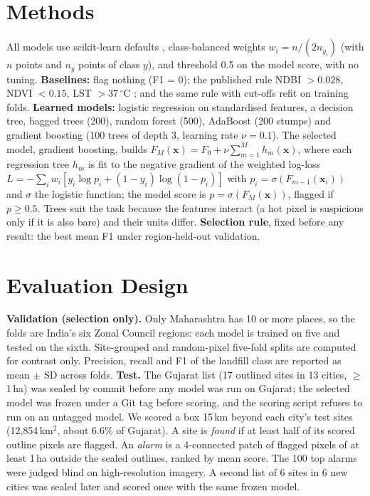 \documentclass{article}
\begin{document}
\section{Methods}
All models use scikit-learn defaults \citep{pedregosa2011}, class-balanced weights $w_i = n/(2n_{y_i})$ (with $n$ points and $n_{y}$ points of class $y$), and threshold 0.5 on the model score, with no tuning. \textbf{Baselines:} flag nothing (F1 = 0); the published rule NDBI $>0.028$, NDVI $<0.15$, LST $>37\,^\circ$C \citep{bhajantri2026}; and the same rule with cut-offs refit on training folds. \textbf{Learned models:} logistic regression on standardised features, a decision tree, bagged trees (200), random forest (500), AdaBoost (200 stumps) and gradient boosting (100 trees of depth 3, learning rate $\nu=0.1$). The selected model, gradient boosting, builds $F_M(\mathbf{x}) = F_0 + \nu\sum_{m=1}^{M} h_m(\mathbf{x})$, where each regression tree $h_m$ is fit to the negative gradient of the weighted log-loss $L=-\sum_i w_i[y_i\log p_i + (1-y_i)\log(1-p_i)]$ with $p_i=\sigma(F_{m-1}(\mathbf{x}_i))$ and $\sigma$ the logistic function; the model score is $p=\sigma(F_M(\mathbf{x}))$, flagged if $p\ge 0.5$. Trees suit the task because the features interact (a hot pixel is suspicious only if it is also bare) and their units differ. \textbf{Selection rule}, fixed before any result: the best mean F1 under region-held-out validation.

\section{Evaluation Design}
\textbf{Validation (selection only).} Only Maharashtra has 10 or more places, so the folds are India's six Zonal Council regions: each model is trained on five and tested on the sixth. Site-grouped and random-pixel five-fold splits are computed for contrast only. Precision, recall and F1 of the landfill class are reported as mean $\pm$ SD across folds. \textbf{Test.} The Gujarat list (17 outlined sites in 13 cities, $\ge$1\,ha) was sealed by commit before any model was run on Gujarat; the selected model was frozen under a Git tag before scoring, and the scoring script refuses to run on an untagged model. We scored a box 15\,km beyond each city's test sites (12,854\,km$^2$, about 6.6\% of Gujarat). A site is \emph{found} if at least half of its scored outline pixels are flagged. An \emph{alarm} is a 4-connected patch of flagged pixels of at least 1\,ha outside the sealed outlines, ranked by mean score. The 100 top alarms were judged blind on high-resolution imagery. A second list of 6 sites in 6 new cities was sealed later and scored once with the same frozen model.
\end{document}
